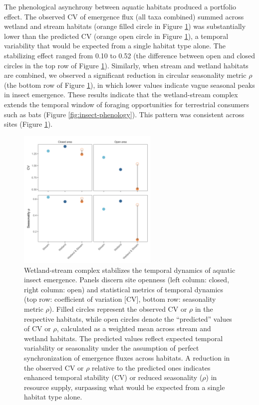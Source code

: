 \documentclass[11pt, class=article, crop=false]{standalone}
\begin{document}
The phenological asynchrony between aquatic habitats produced a portfolio effect.
The observed CV of emergence flux (all taxa combined) summed across wetland and stream habitats (orange filled circle in Figure \ref{fig:cv-emergence}) was substantially lower than the predicted CV (orange open circle in Figure \ref{fig:cv-emergence}), a temporal variability that would be expected from a single habitat type alone.
The stabilizing effect ranged from 0.10 to 0.52 (the difference between open and closed circles in the top row of Figure \ref{fig:cv-emergence}).
Similarly, when stream and wetland habitats are combined, we observed a significant reduction in circular seasonality metric $\rho$ (the bottom row of Figure \ref{fig:cv-emergence}), in which lower values indicate vague seasonal peaks in insect emergence.
These results indicate that the wetland-stream complex extends the temporal window of foraging opportunities for terrestrial consumers such as bats (Figure \ref{fig:insect-phenology}).
This pattern was consistent across sites (Figure \ref{fig:cv-emergence}).

\begin{figure}
    \centering
    \includegraphics[width=0.6\textwidth]{figure_cv_rho.png}
    \caption{Wetland-stream complex stabilizes the temporal dynamics of aquatic insect emergence. Panels discern site openness (left column: closed, right column: open) and statistical metrics of temporal dynamics (top row: coefficient of variation [CV], bottom row: seasonality metric $\rho$). Filled circles represent the observed CV or $\rho$ in the respective habitats, while open circles denote the ``predicted'' values of CV or $\rho$, calculated as a weighted mean across stream and wetland habitats. The predicted values reflect expected temporal variability or seasonality under the assumption of perfect synchronization of emergence fluxes across habitats. A reduction in the observed CV or $\rho$ relative to the predicted ones indicates enhanced temporal stability (CV) or reduced seasonality ($\rho$) in resource supply, surpassing what would be expected from a single habitat type alone.}
    \label{fig:cv-emergence}
\end{figure}
\end{document}
